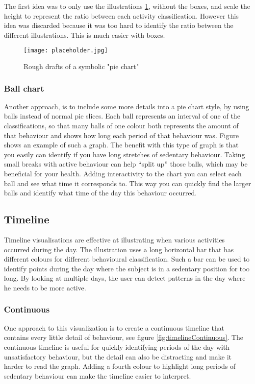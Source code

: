 The first idea was to only use the illustrations \ref{fig:symbolicPie}, without the boxes, and scale the height to represent the ratio between each activity classification. However this idea was discarded because it was too hard to identify the ratio between the different illustrations. This is much easier with boxes.

\begin{figure}[h!]
	\centering
		\texttt{[image: placeholder.jpg]}
		\caption{\footnotesize Rough drafts of a symbolic "pie chart"}
		\label{fig:symbolicPie}
\end{figure}

\subsubsection{Ball chart}
Another approach, is to include some more details into a pie chart style, by using balls instead of normal pie slices. Each ball represents an interval of one of the classifications, so that many balls of one colour both represents the amount of that behaviour and shows how long each period of that behaviour was. Figure %
shows an example of such a graph. The benefit with this type of graph is that you easily can identify if you have long stretches of sedentary behaviour. Taking small breaks with active behaviour can help ``split up'' those balls, which may be beneficial for your health. Adding interactivity to the chart you can select each ball and see what time it corresponds to. This way you can quickly find the larger balls and identify what time of the day this behaviour occurred. 

\subsection{Timeline}
Timeline visualisations are effective at illustrating when various activities occurred during the day. The illustration uses a long horizontal bar that has different colours for different behavioural classification. Such a bar can be used to identify points during the day where the subject is in a sedentary position for too long. By looking at multiple days, the user can detect patterns in the day where he needs to be more active.

\subsubsection{Continuous}
One approach to this visualization is to create a continuous timeline that contains every little detail of behaviour, see figure \ref{fig:timelineContinuous}. The continuous timeline is useful for quickly identifying periods of the day with unsatisfactory behaviour, but the detail can also be distracting and make it harder to read the graph. Adding a fourth colour to highlight long periods of sedentary behaviour can make the timeline easier to interpret.

